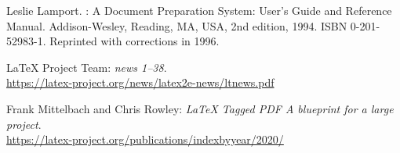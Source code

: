 \documentclass{ltnews}
\providecommand\Dash {\unskip \textemdash}
\begin{document}
\medskip

\begin{thebibliography}{9}



Leslie Lamport.
\newblock {\LaTeX}: {A} Document Preparation System: User's Guide and Reference
  Manual.
\newblock \mbox{Addison}-Wesley, Reading, MA, USA, 2nd edition, 1994.
\newblock ISBN 0-201-52983-1.
\newblock Reprinted with corrections in 1996.


 \LaTeX{} Project Team:
  \emph{\LaTeXe{} news 1--38}.\\
  \url{https://latex-project.org/news/latex2e-news/ltnews.pdf}

 Frank Mittelbach and Chris Rowley:
  \emph{\LaTeX{} Tagged PDF \Dash A blueprint for a large project}.\\
  \url{https://latex-project.org/publications/indexbyyear/2020/}



\end{thebibliography}
\end{document}
